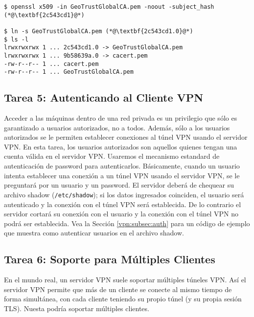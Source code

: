 \begin{lstlisting}
$ openssl x509 -in GeoTrustGlobalCA.pem -noout -subject_hash
(*@\textbf{2c543cd1}@*)

$ ln -s GeoTrustGlobalCA.pem (*@\textbf{2c543cd1.0}@*)
$ ls -l
lrwxrwxrwx 1 ... 2c543cd1.0 -> GeoTrustGlobalCA.pem
lrwxrwxrwx 1 ... 9b58639a.0 -> cacert.pem
-rw-r--r-- 1 ... cacert.pem
-rw-r--r-- 1 ... GeoTrustGlobalCA.pem
\end{lstlisting}


\subsection{Tarea 5: Autenticando al Cliente VPN}

Acceder a las máquinas dentro de una red privada es un privilegio que sólo es garantizado a usuarios autorizados, no a todos. Además, sólo a los usuarios autorizados se le permiten establecer conexiones al túnel VPN usando el servidor VPN.
En esta tarea, los usuarios autorizados son aquellos quienes tengan una cuenta válida en el servidor VPN.
Usaremos el mecanismo estandard de autenticación de password para autenticarlos. Básicamente, cuando un usuario intenta establecer una conexión a un túnel VPN usando el servidor VPN, se le preguntará por un usuario y un password. El servidor deberá de chequear su archivo shadow (\texttt{/etc/shadow}); si los datos ingresados coinciden, el usuario será autenticado y la conexión con el túnel VPN será establecida. De lo contrario el servidor cortará su conexión con el usuario y la conexión con el túnel VPN no podrá ser establecida.
Vea la Sección \ref{vpn:subsec:auth} para un código de ejemplo que muestra como autenticar usuarios en el archivo shadow.


\subsection{Tarea 6: Soporte para Múltiples Clientes}

En el mundo real, un servidor VPN suele soportar múltiples túneles VPN.
Así el servidor VPN permite que más de un cliente se conecte al mismo tiempo de forma simultánea, con cada cliente teniendo su propio túnel (y su propia sesión TLS). Nuesta \miniVPN podría soportar múltiples clientes.

